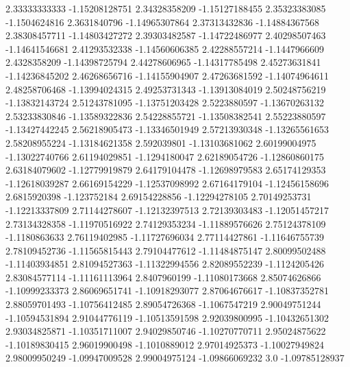   2.33333333333   -1.15208128751
  2.34328358209   -1.15127188455
  2.35323383085    -1.1504624816
   2.3631840796   -1.14965307864
  2.37313432836   -1.14884367568
  2.38308457711   -1.14803427272
  2.39303482587   -1.14722486977
  2.40298507463   -1.14641546681
  2.41293532338   -1.14560606385
  2.42288557214    -1.1447966609
   2.4328358209   -1.14398725794
  2.44278606965   -1.14317785498
  2.45273631841   -1.14236845202
  2.46268656716   -1.14155904907
  2.47263681592   -1.14074964611
  2.48258706468   -1.13994024315
  2.49253731343   -1.13913084019
  2.50248756219   -1.13832143724
  2.51243781095   -1.13751203428
   2.5223880597   -1.13670263132
  2.53233830846   -1.13589322836
  2.54228855721   -1.13508382541
  2.55223880597   -1.13427442245
  2.56218905473   -1.13346501949
  2.57213930348   -1.13265561653
  2.58208955224   -1.13184621358
    2.592039801   -1.13103681062
  2.60199004975   -1.13022740766
  2.61194029851    -1.1294180047
  2.62189054726   -1.12860860175
  2.63184079602   -1.12779919879
  2.64179104478   -1.12698979583
  2.65174129353   -1.12618039287
  2.66169154229   -1.12537098992
  2.67164179104   -1.12456158696
   2.6815920398     -1.123752184
  2.69154228856   -1.12294278105
  2.70149253731   -1.12213337809
  2.71144278607   -1.12132397513
  2.72139303483   -1.12051457217
  2.73134328358   -1.11970516922
  2.74129353234   -1.11889576626
  2.75124378109    -1.1180863633
  2.76119402985   -1.11727696034
  2.77114427861   -1.11646755739
  2.78109452736   -1.11565815443
  2.79104477612   -1.11484875147
  2.80099502488   -1.11403934851
  2.81094527363   -1.11322994556
  2.82089552239    -1.1124205426
  2.83084577114   -1.11161113964
   2.8407960199   -1.11080173668
  2.85074626866   -1.10999233373
  2.86069651741   -1.10918293077
  2.87064676617   -1.10837352781
  2.88059701493   -1.10756412485
  2.89054726368    -1.1067547219
  2.90049751244   -1.10594531894
  2.91044776119   -1.10513591598
  2.92039800995   -1.10432651302
  2.93034825871   -1.10351711007
  2.94029850746   -1.10270770711
  2.95024875622   -1.10189830415
  2.96019900498    -1.1010889012
  2.97014925373   -1.10027949824
  2.98009950249   -1.09947009528
  2.99004975124   -1.09866069232
            3.0   -1.09785128937
